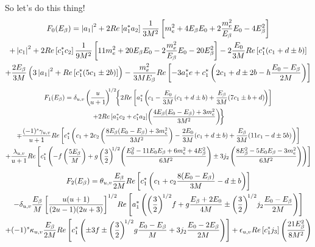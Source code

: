 So let's do this thing!
\begin{multline}
F_0(E_{\beta}) = 
\left| a_1 \right|^2 
+ 2 Re\left[ a_1^* a_2 \right] \frac{1}{3 M^2} 
\left[  
	m_e^2 + 4 E_{\beta} E_0 + 2 \frac{m_e^2}{E_{\beta}}E_0 - 4E_{\beta}^2
\right]
\\
+ \left| c_1 \right|^2
+ 2 Re\left[ c_1^* c_2\right] \frac{1}{9 M^2} 
\left[
	11 m_e^2 + 20 E_{\beta} E_0 
	- 2\frac{m_e^2}{E_{\beta}}E_0
	- 20E_{\beta}^2
\right]
- 2 \frac{E_0}{3M} Re\left[ c_1^*(c_1 + d \pm b)\right]
\\
+ \frac{2E_{\beta}}{3M} 
\left( 
	3 \left| a_1 \right|^2 + Re \left[ c_1^*(5c_1 \pm 2 b) \right]
\right)
- \frac{m_e^2}{3 M E_{\beta}} 
Re \left[ 
	-3 a_1^*e + c_1^*\left(2c_1 + d \pm 2b - h\frac{E_0 - E_{\beta}}{2M} \right)
\right]
\end{multline}
\begin{multline}
F_1(\Ee) = 
\deltauv \left( \frac{u}{\!u+1\!} \right)^{\!\!1/2} \!\!
\left\{
	2 Re\left[ 
		a_1^*\left(\! c_1 - \frac{E_0}{3M}(c_1 + d \pm b) + \frac{\Ee}{3M}( 7 c_1 \pm b + d )\! \right)
	\right]
	\right.\\\left.
	+
	2 Re\left[
		a_1^* c_2 + c_1^* a_2
	\right] \!
	\left(
		\frac{4 \E(E_0 - \E) + 3 \me^2}{3M^2}
	\right) \!
\right\}
\\
\mp \frac{ (-1)^s \gammauv}{u+1} 
Re \left[
	c_1^*\left(
		c_1 + 2 c_2 \left(\frac{8\Ee(E_0-\Ee)+3\me^2}{3M^2}\right)
		- \frac{2 E_0}{3 M} (c_1 + d \pm b) 
		+ \frac{\Ee}{3M} (11 c_1 - d \pm 5 b)
	\right)
\right]
\\
+ 
\frac{\lambdauv}{u+1}
Re \left[
	c_1^* \left(
		- f \left(\frac{5\Ee}{M}\right)
		+ g \left( \frac{3}{2} \right)^{\!\!1/2} \!
		\left(
			\frac{E_0^2 - 11 E_0 \Ee + 6 \me^2 + 4\Ee^2 }{6M^2}
		\right)
		\pm 3 j_2 
		\left(
			\frac{8 \Ee^2 - 5E_0 \Ee - 3 \me^2}{6M^2}
		\right)
	\right)
\right]
\end{multline}
%
\begin{multline}
F_2(E_{\beta}) = 
\theta_{u,v} \frac{E_{\beta}}{2M} 
Re\left[
	c_1^*\left(
		c_1 + c_2 \frac{8(E_0-E_{\beta})}{3M}
		-d \pm b
	\right)
\right]
\\
- \delta_{u,v} \frac{E_{\beta}}{M} 
\left[ \frac{u(u+1)}{(2u-1)(2u+3)} \right]^{1/2} \!
Re \left[
	a_1^*\left( 
		\left( \frac{3}{2} \right)^{\!1/2}\! f
		+ g \frac{E_{\beta}+2E_0}{4M} 
		\pm \left( \frac{3}{2} \right)^{\!1/2}\! j_2 \frac{E_0-E_{\beta}}{2M}
	\right)
\right]
\\
+ (-1)^s \kappa_{u,v} \frac{E_{\beta}}{2M}
Re \left[
	c_1^* \left(
		\pm 3 f 
		\pm \left( \frac{3}{2} \right)^{\!1/2}\! g \frac{E_0-E_{\beta}}{M}
		+ 3 j_2 \frac{E_0-2E_{\beta}}{2M}
	\right)
\right]
+ \epsilon_{u,v} Re\left[ c_1^* j_3 \right]
\left( 
	\frac{21 E_{\beta}^2}{8 M^2}
\right)
\end{multline}
